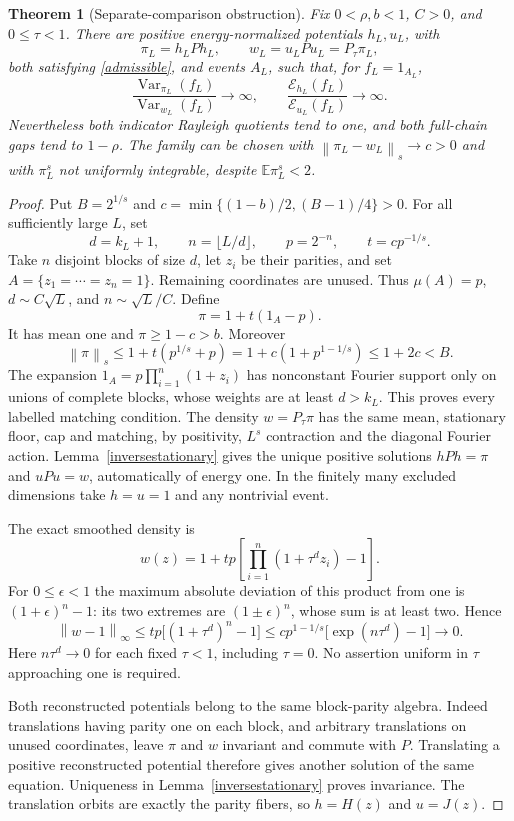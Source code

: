 \documentclass[11pt]{article}
\newcommand{\E}{\mathbb E}
\newcommand{\norm}[1]{\left\|#1\right\|}
\newtheorem{theorem}{Theorem}[section]
\begin{document}
\begin{theorem}[Separate-comparison obstruction]\label{separatecomparisonfailure}
Fix $0<\rho,b<1$, $C>0$, and $0\leq\tau<1$. There are positive
energy-normalized potentials $h_L,u_L$, with
\[
 \pi_L=h_LPh_L,\qquad w_L=u_LPu_L=P_\tau\pi_L,
\]
both satisfying \eqref{admissible}, and events $A_L$, such that, for
$f_L=1_{A_L}$,
\[
 \frac{\operatorname{Var}_{\pi_L}(f_L)}{\operatorname{Var}_{w_L}(f_L)}
 \longrightarrow\infty,\qquad
 \frac{\mathcal E_{h_L}(f_L)}{\mathcal E_{u_L}(f_L)}
 \longrightarrow\infty.
\]
Nevertheless both indicator Rayleigh quotients tend to one, and both
full-chain gaps tend to $1-\rho$. The family can be chosen with
$\norm{\pi_L-w_L}_s\to c>0$ and with $\pi_L^s$ not uniformly
integrable, despite $\E\pi_L^s<2$.
\end{theorem}
\begin{proof}
Put $B=2^{1/s}$ and $c=\min\{(1-b)/2,(B-1)/4\}>0$.
For all sufficiently large $L$, set
\[
 d=k_L+1,\qquad n=\lfloor L/d\rfloor,\qquad p=2^{-n},
 \qquad t=cp^{-1/s}.
\]
Take $n$ disjoint blocks of size $d$, let $z_i$ be their parities,
and set $A=\{z_1=\cdots=z_n=1\}$. Remaining coordinates are unused.
Thus $\mu(A)=p$, $d\sim C\sqrt L$, and $n\sim\sqrt L/C$.
Define
\[
 \pi=1+t(1_A-p).
\]
It has mean one and $\pi\geq1-c>b$. Moreover
\[
 \norm\pi_s\leq1+t(p^{1/s}+p)
       =1+c(1+p^{1-1/s})\leq1+2c<B.
\]
The expansion $1_A=p\prod_{i=1}^n(1+z_i)$ has nonconstant Fourier
support only on unions of complete blocks, whose weights are at least
$d>k_L$. This proves every labelled matching condition. The density
$w=P_\tau\pi$ has the same mean, stationary floor, cap and matching,
by positivity, $L^s$ contraction and the diagonal Fourier action.
Lemma~\ref{inversestationary} gives the unique positive solutions
$hPh=\pi$ and $uPu=w$, automatically of energy one. In the finitely
many excluded dimensions take $h=u=1$ and any nontrivial event.

The exact smoothed density is
\[
 w(z)=1+tp\left[\prod_{i=1}^n(1+\tau^d z_i)-1\right].
\]
For $0\leq\epsilon<1$ the maximum absolute deviation of this product
from one is $(1+\epsilon)^n-1$: its two extremes are
$(1\pm\epsilon)^n$, whose sum is at least two. Hence
\[
 \norm{w-1}_\infty
 \leq tp\big[(1+\tau^d)^n-1\big]
 \leq cp^{1-1/s}\big[\exp(n\tau^d)-1\big]\longrightarrow0.
\]
Here $n\tau^d\to0$ for each fixed $\tau<1$, including $\tau=0$.
No assertion uniform in $\tau$ approaching one is required.

Both reconstructed potentials belong to the same block-parity algebra.
Indeed translations having parity one on each block, and arbitrary
translations on unused coordinates, leave $\pi$ and $w$ invariant and
commute with $P$. Translating a positive reconstructed potential therefore
gives another solution of the same equation. Uniqueness in
Lemma~\ref{inversestationary} proves invariance. The translation orbits
are exactly the parity fibers, so $h=H(z)$ and $u=J(z)$.


\end{proof}
\end{document}
